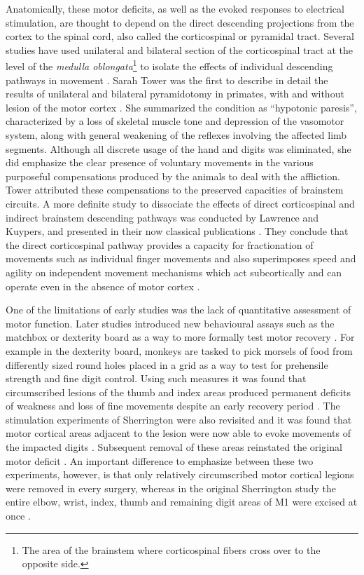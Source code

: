 Anatomically, these motor deficits, as well as the evoked responses to electrical stimulation, are thought to depend on the direct descending projections from the cortex to the spinal cord, also called the corticospinal or pyramidal tract. Several studies have used unilateral and bilateral section of the corticospinal tract at the level of the \textit{medulla oblongata}\footnote{The area of the brainstem where corticospinal fibers cross over to the opposite side.} to isolate the effects of individual descending pathways in movement \cite{Tower1940,Lawrence1968,Lawrence1968a}. Sarah Tower was the first to describe in detail the results of unilateral and bilateral pyramidotomy in primates, with and without lesion of the motor cortex \cite{Tower1940}. She summarized the condition as ``hypotonic paresis'', characterized by a loss of skeletal muscle tone and depression of the vasomotor system, along with general weakening of the reflexes involving the affected limb segments. Although all discrete usage of the hand and digits was eliminated, she did emphasize the clear presence of voluntary movements in the various purposeful compensations produced by the animals to deal with the affliction. Tower attributed these compensations to the preserved capacities of brainstem circuits. A more definite study to dissociate the effects of direct corticospinal and indirect brainstem descending pathways was conducted by Lawrence and Kuypers, and presented in their now classical publications \cite{Lawrence1968,Lawrence1968a}. They conclude that the direct corticospinal pathway provides a capacity for fractionation of movements such as individual finger movements and also superimposes speed and agility on independent movement mechanisms which act subcortically and can operate even in the absence of motor cortex \cite{Lawrence1968}.

One of the limitations of early studies was the lack of quantitative assessment of motor function. Later studies introduced new behavioural assays such as the matchbox or dexterity board as a way to more formally test motor recovery \cite{Glees1950,Cole1952}. For example in the dexterity board, monkeys are tasked to pick morsels of food from differently sized round holes placed in a grid as a way to test for prehensile strength and fine digit control. Using such measures it was found that circumscribed lesions of the thumb and index areas produced permanent deficits of weakness and loss of fine movements despite an early recovery period \cite{Glees1950}. The stimulation experiments of Sherrington \cite{Leyton1917} were also revisited and it was found that motor cortical areas adjacent to the lesion were now able to evoke movements of the impacted digits \cite{Glees1950}. Subsequent removal of these areas reinstated the original motor deficit \cite{Glees1950}. An important difference to emphasize between these two experiments, however, is that only relatively circumscribed motor cortical legions were removed in every surgery, whereas in the original Sherrington study the entire elbow, wrist, index, thumb and remaining digit areas of M1 were excised at once \cite{Leyton1917}.


